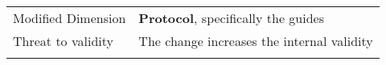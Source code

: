 \begin{table*}[h]
\begin{tabularx}{\textwidth}{
  >{\hsize=0.3\hsize}X
  >{\hsize=0.8\hsize}X}
     Modified Dimension & 
   \textbf{Protocol}, specifically the guides  \\ 
    Threat to validity & The change increases the internal validity \\  
   \noalign{\smallskip\smallskip}\hline
    
	\end{tabularx}  
	
\end{table*}